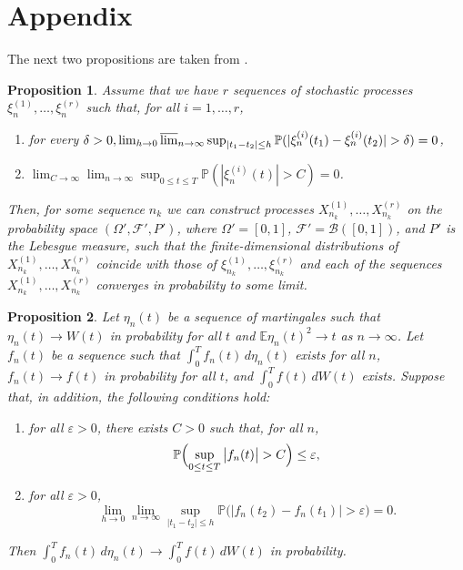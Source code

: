 \documentclass[numbers,compress,v1.0.1]{vmsta}
\newtheorem{prop}{Proposition}
\theoremstyle{remark}
\newcommand{\F}{\mathcal F}
\newcommand{\E}{\mathbb E}
\renewcommand{\P}{\mathbb P}
\newcommand*{\abs}[1]{\left\lvert#1\right\rvert}
\begin{document}
\section{Appendix}\label{app}
The next two propositions are taken from \cite{Skorokhod65}.
%
\begin{prop} \label{prop}
Assume that we have $r$ sequences of stochastic processes
$\xi_n^{(1)}, \ldots, \xi_n^{(r)}$ such that, for all $i=1,\ldots,r$,
%
\begin{enumerate}[\rm(i)]
%
\item for every $\delta> 0, \lim_{h \rightarrow
0}\varlimsup_{n\rightarrow\infty}\sup_{\abs{t_1-t_2} \leq h} \P
(|\xi_n^{(i)}(t_1) -\xi_n^{(i)}(t_2)| > \delta )= 0$,
%
\item$\lim_{C\rightarrow\infty}\lim_{n\rightarrow\infty
}\sup_{0\leq t \leq T}\P (|\xi_n^{(i)}(t)| >C )=0$.
\end{enumerate}
%
Then, for some sequence $n_k$ we can construct processes
$X_{n_k}^{(1)},\ldots,X_{n_k}^{(r)}$ on the probability space
$(\varOmega', \F', P')$, where $\varOmega'=[0,1]$,
$\F'=\mathcal B ([0,1])$, and $P'$ is the Lebesgue measure, such
that the finite-dimensional distributions of
$X_{n_k}^{(1)},\ldots,X_{n_k}^{(r)}$ coincide with those of
$\xi_{n_k}^{(1)},\ldots,\xi_{n_k}^{(r)}$ and each of the sequences
$X_{n_k}^{(1)},\ldots,X_{n_k}^{(r)}$ converges in probability to
some limit.
\end{prop}
%
\begin{prop}
Let $\eta_n(t)$ be a sequence of martingales such that $\eta
_n(t)\rightarrow W(t)$ in probability for all $t$ and
$\E\eta_n(t)^2\rightarrow t$ as $n\rightarrow\infty$. Let $f_n(t)$ be
a sequence such that $\int_0^T f_n(t)\,d\eta_n(t)$ exists for all $n$,
$f_n(t)\rightarrow f(t)$ in probability for all $t$, and $\int_0^T
f(t)\,dW(t)$ exists.
Suppose that, in addition, the following conditions hold:
%
\begin{enumerate}[\rm(i)]
%
\item
for all $\varepsilon>0$, there exists $C >0$ such that, for all $n$,
%
\[
\P \Bigl(\sup_{0 \leq t \leq T}\big|f_n(t)\big| >C \Bigr)\leq
\varepsilon,
\]
%
\item
for all $\varepsilon>0$,
%
\[
\lim_{h\rightarrow0}\lim_{n\rightarrow\infty}\sup
_{\abs{t_1-t_2} \leq
h}\P\bigl(\big|f_n(t_2)-f_n(t_1)\big|
> \varepsilon\bigr)=0.
\]
%
\end{enumerate}
%
Then $\int_0^T f_n(t)\,d \eta_n(t)\rightarrow\int_0^T f(t)\,dW(t)$ in
probability.
\end{prop}
%
\end{document}
